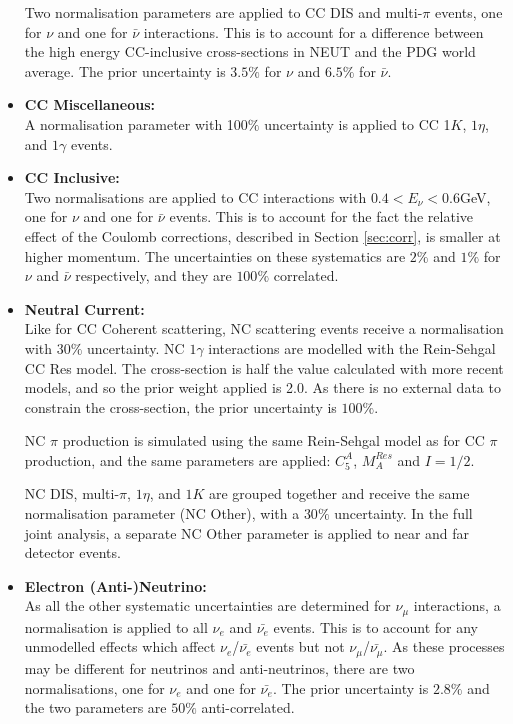\begin{itemize}
Two normalisation parameters are applied to CC DIS and multi-$\pi$ events, one for $\nu$ and one for $\bar{\nu}$ interactions. This is to account for a difference between the high energy CC-inclusive cross-sections in NEUT and the PDG world average. The prior uncertainty is $3.5\%$ for $\nu$ and $6.5\%$ for $\bar{\nu}$.

\item \textbf{CC Miscellaneous:}\\
A normalisation parameter with 100$\%$ uncertainty is applied to CC 1$K$, $1\eta$, and $1\gamma$ events.

\item \textbf{CC Inclusive:}\\
Two normalisations are applied to CC interactions with $0.4 < E_{\nu} < 0.6$GeV, one for $\nu$ and one for $\bar{\nu}$ events. This is to account for the fact the relative effect of the Coulomb corrections, described in Section \ref{sec:corr}, is smaller at higher momentum. The uncertainties on these systematics are $2\%$ and $1\%$ for $\nu$ and $\bar{\nu}$ respectively, and they are $100\%$ correlated.

\item \textbf{Neutral Current:}\\
Like for CC Coherent scattering, NC scattering events receive a normalisation with $30\%$ uncertainty. NC $1\gamma$ interactions are modelled with the Rein-Sehgal CC Res model. The cross-section is half the value calculated with more recent models\cite{NCxsec}, and so the prior weight applied is 2.0. As there is no external data to constrain the cross-section, the prior uncertainty is $100\%$.

NC $\pi$ production is simulated using the same Rein-Sehgal model as for CC $\pi$ production, and the same parameters are applied: $C^{A}_{5}$, $M^{Res}_{A}$ and $I=1/2$.

NC DIS, multi-$\pi$, $1\eta$, and $1K$ are grouped together and receive the same normalisation parameter (NC Other), with a $30\%$ uncertainty. In the full joint analysis, a separate NC Other parameter is applied to near and far detector events.

\item \textbf{Electron (Anti-)Neutrino:}\\
As all the other systematic uncertainties are determined for $\nu_{\mu}$ interactions, a normalisation is applied to all $\nu_{e}$ and $\bar{\nu_{e}}$ events. This is to account for any unmodelled effects which affect $\nu_{e}$/$\bar{\nu_{e}}$ events but not $\nu_{\mu}$/$\bar{\nu_{\mu}}$. As these processes may be different for neutrinos and anti-neutrinos, there are two normalisations, one for $\nu_{e}$ and one for $\bar{\nu_{e}}$. The prior uncertainty is $2.8\%$ and the two parameters are $50\%$ anti-correlated.


\end{itemize}
